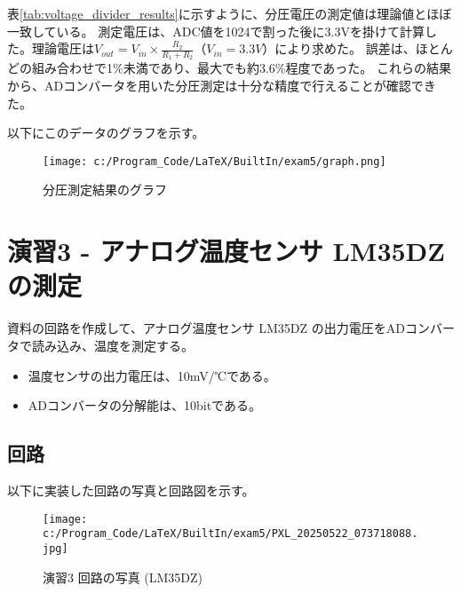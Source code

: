 \documentclass[a4paper,11pt,dvipdfmx]{jsarticle}
\begin{document}
\noindent
表\ref{tab:voltage_divider_results}に示すように、分圧電圧の測定値は理論値とほぼ一致している。
測定電圧は、ADC値を1024で割った後に3.3Vを掛けて計算した。理論電圧は$V_{out}=V_{in} \times \frac{R_2}{R_1+R_2}$（$V_{in}=3.3V$）により求めた。
誤差は、ほとんどの組み合わせで1\%未満であり、最大でも約3.6\%程度であった。
これらの結果から、ADコンバータを用いた分圧測定は十分な精度で行えることが確認できた。

以下にこのデータのグラフを示す。
\begin{figure}[h]
    \centering
    \texttt{[image: c:/Program\_Code/LaTeX/BuiltIn/exam5/graph.png]}
    \caption{分圧測定結果のグラフ}
    \label{fig:voltage_divider_graph}
\end{figure}

\section{演習3 - アナログ温度センサ LM35DZの測定}

\begin{shaded}
    \noindent
    資料の回路を作成して、アナログ温度センサ LM35DZ の出力電圧をADコンバータで読み込み、温度を測定する。
    \begin{itemize}
        \item 温度センサの出力電圧は、10mV/℃である。
        \item ADコンバータの分解能は、10bitである。
    \end{itemize}
\end{shaded}

\subsection{回路}
以下に実装した回路の写真と回路図を示す。
\begin{figure}[h]
    \centering
    \texttt{[image: c:/Program\_Code/LaTeX/BuiltIn/exam5/PXL\_20250522\_073718088.jpg]}
    \caption{演習3 回路の写真 (LM35DZ)}
    \label{fig:exam3-photo}
\end{figure}
\end{document}
